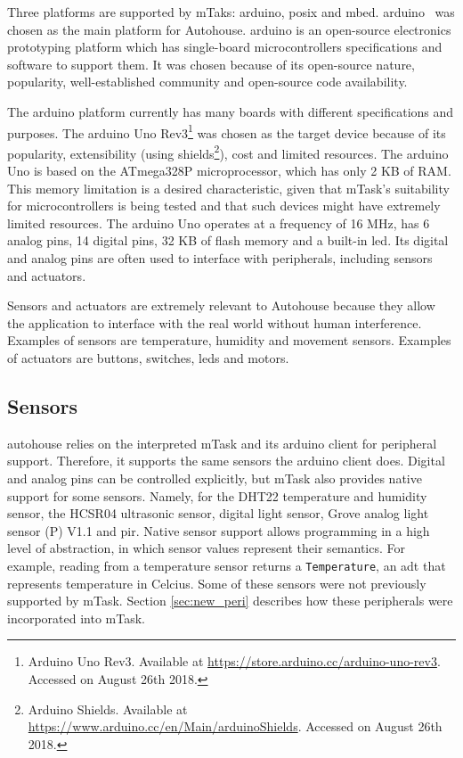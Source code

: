 Three platforms are supported by mTaks: \gls{arduino}, \acs{posix} and \gls{mbed}. \gls{arduino}~\cite{arduino} was chosen as the main platform for Autohouse. \gls{arduino} is an open-source electronics prototyping platform which has single-board microcontrollers specifications and software to support them. It was chosen because of its open-source nature, popularity, well-established community and open-source code availability.

The \gls{arduino} platform currently has many boards with different specifications and purposes. The \gls{arduino} Uno Rev3\footnote{Arduino Uno Rev3. Available at \url{https://store.arduino.cc/arduino-uno-rev3}. Accessed on August 26th 2018.} was chosen as the target device because of its popularity, extensibility (using shields\footnote{Arduino Shields. Available at \url{https://www.arduino.cc/en/Main/arduinoShields}. Accessed on August 26th 2018.}), cost and limited resources. The \gls{arduino} Uno is based on the ATmega328P microprocessor, which has only 2 KB of RAM. This memory limitation is a desired characteristic, given that \gls{mTask}'s suitability for microcontrollers is being tested and that such devices might have extremely limited resources. The \gls{arduino} Uno operates at a frequency of 16 MHz, has 6 analog pins, 14 digital pins, 32 KB of flash memory and a built-in \acs{led}. Its digital and analog pins are often used to interface with peripherals, including sensors and actuators. 



Sensors and actuators are extremely relevant to Autohouse because they allow the application to interface with the real world without human interference. Examples of sensors are temperature, humidity and movement sensors. Examples of actuators are buttons, switches, \acsp{led} and motors.

\subsection{Sensors}

\gls{autohouse} relies on the interpreted \gls{mTask} and its \gls{arduino} client for peripheral support. Therefore, it supports the same sensors the \gls{arduino} client does. Digital and analog pins can be controlled explicitly, but \gls{mTask} also provides native support for some sensors. Namely, for the DHT22 temperature and humidity sensor, the HCSR04 ultrasonic sensor, digital light sensor, Grove analog light sensor (P) V1.1 and \ac{pir}. Native sensor support allows programming in a high level of abstraction, in which sensor values represent their semantics. For example, reading from a temperature sensor returns a \texttt{Temperature}, an \acs{adt} that represents temperature in Celcius. Some of these sensors were not previously supported by \gls{mTask}. Section \ref{sec:new_peri} describes how these peripherals were incorporated into \gls{mTask}.

